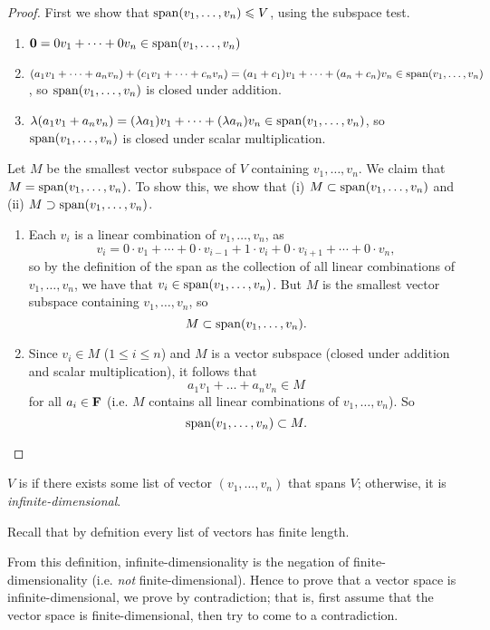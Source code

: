 \begin{proof}
First we show that $\operatorname{span}(v_1,\dots,v_n)\leqslant V$, using the subspace test.
\begin{enumerate}[label=(\roman*)]
\item $\vb{0}=0v_1+\cdots+0v_n\in\operatorname{span}(v_1,\dots,v_n)$
\item $(a_1v_1+\cdots+a_nv_n)+(c_1v_1+\cdots+c_nv_n)=(a_1+c_1)v_1+\cdots+(a_n+c_n)v_n\in\operatorname{span}(v_1,\dots,v_n)$, so $\operatorname{span}(v_1,\dots,v_n)$ is closed under addition.
\item $\lambda(a_1v_1+a_nv_n)=(\lambda a_1)v_1+\cdots+(\lambda a_n)v_n\in\operatorname{span}(v_1,\dots,v_n)$, so $\operatorname{span}(v_1,\dots,v_n)$ is closed under scalar multiplication.
\end{enumerate}

Let $M$ be the smallest vector subspace of $V$ containing $v_1,\dots,v_n$. We claim that $M=\operatorname{span}(v_1,\dots,v_n)$. To show this, we show that (i) $M\subset\operatorname{span}(v_1,\dots,v_n)$ and (ii) $M\supset\operatorname{span}(v_1,\dots,v_n)$.
\begin{enumerate}[label=(\roman*)]
\item Each $v_i$ is a linear combination of $v_1,\dots,v_n$, as
\[v_i=0\cdot v_1+\cdots+0\cdot v_{i-1}+1\cdot v_i+0\cdot v_{i+1}+\cdots+0\cdot v_n,\]
so by the definition of the span as the collection of all linear combinations of $v_1,\dots,v_n$, we have that $v_i\in\operatorname{span}(v_1,\dots,v_n)$. But $M$ is the smallest vector subspace containing $v_1,\dots,v_n$, so
\[M\subset\operatorname{span}(v_1,\dots,v_n).\]
\item Since $v_i\in M$ ($1\le i\le n$) and $M$ is a vector subspace (closed under addition and scalar multiplication), it follows that
\[a_1v_1+\dots+a_nv_n\in M\]
for all $a_i\in\mathbf F$ (i.e. $M$ contains all linear combinations of $v_1,\dots,v_n$). So
\[\operatorname{span}(v_1,\dots,v_n)\subset M.\]
\end{enumerate}
\end{proof}

\begin{definition}
$V$ is  if there exists some list of vector $(v_1,\dots,v_n)$ that spans $V$; otherwise, it is \emph{infinite-dimensional}.
\end{definition}

\begin{remark}
Recall that by defnition every list of vectors has finite length.
\end{remark}

\begin{remark}
From this definition, infinite-dimensionality is the negation of finite-dimensionality (i.e. \emph{not} finite-dimensional). Hence to prove that a vector space is infinite-dimensional, we prove by contradiction; that is, first assume that the vector space is finite-dimensional, then try to come to a contradiction.
\end{remark}

